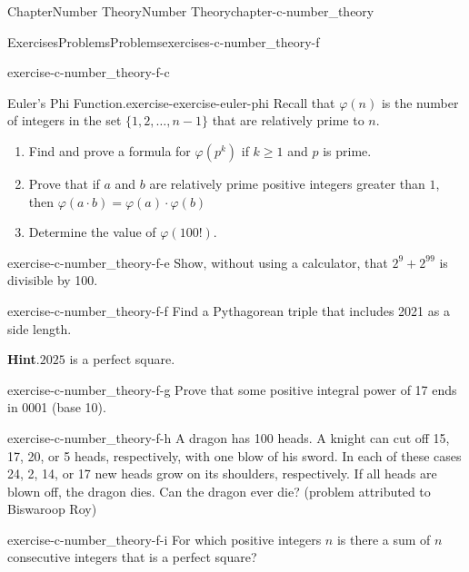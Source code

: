 \documentclass[oneside,10pt,]{book}
\newcommand{\blocktitlefont}{\relax}
\numberwithin{equation}{section}
\begin{document}
\begin{chapterptx}{Chapter}{Number Theory}{}{Number Theory}{}{}{chapter-c-number_theory}
\begin{exercises-section}{Exercises}{Problems}{}{Problems}{}{}{exercises-c-number_theory-f}
\begin{divisionexercise}{1}{}{}{exercise-c-number_theory-f-c}
\begin{enumerate}[label=(\alph*)]
\end{enumerate}
%
\end{divisionexercise}%
\begin{divisionexercise}{2}{Euler's Phi Function.}{}{exercise-exercise-euler-phi}%
Recall that \(\varphi(n)\) is the number of integers in the set \(\{1,2, \ldots  , n-1\}\) that are relatively prime to \(n\).%
\begin{enumerate}[label=(\alph*)]
\item{}Find and prove a formula for \(\varphi \left(p^k\right)\) if \(k\geq 1\) and \(p\) is prime.%
\item{}Prove that if \(a\) and \(b\) are relatively prime positive integers greater than \(1\), then  \(\varphi(a \cdot b)=\varphi(a) \cdot \varphi(b)\)%
\item{}Determine the value of \(\varphi(100!)\).%
\end{enumerate}
%
\end{divisionexercise}%
\begin{divisionexercise}{3}{}{}{exercise-c-number_theory-f-e}%
Show, without using a calculator, that \(2^9 + 2^{99}\) is divisible by 100.%
\end{divisionexercise}%
\begin{divisionexercise}{4}{}{}{exercise-c-number_theory-f-f}%
Find a Pythagorean triple that includes 2021 as a side length.%
\par\smallskip%
\noindent\textbf{\blocktitlefont Hint}.\hypertarget{hint-c-number_theory-f-f-b}{}\quad{}\(2025\) is a perfect square.%
\end{divisionexercise}%
\begin{divisionexercise}{5}{}{}{exercise-c-number_theory-f-g}%
Prove that some positive integral power of 17 ends in 0001 (base 10).%
\end{divisionexercise}%
\begin{divisionexercise}{6}{}{}{exercise-c-number_theory-f-h}%
A dragon has 100 heads. A knight can cut off 15, 17, 20, or 5 heads, respectively, with one blow of his sword. In each of these cases 24, 2, 14, or 17 new heads grow on its shoulders, respectively. If all heads are blown off, the dragon dies. Can the dragon ever die? (problem attributed to Biswaroop Roy)%
\end{divisionexercise}%
\begin{divisionexercise}{7}{}{}{exercise-c-number_theory-f-i}%
For which positive integers \(n\) is there a sum of \(n\) consecutive integers that is a perfect square?%
\end{divisionexercise}%

\end{exercises-section}
\end{chapterptx}
\end{document}
